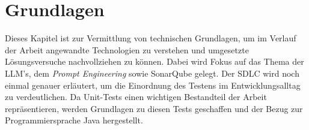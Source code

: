 
\chapter{Grundlagen}
Dieses Kapitel ist zur Vermittlung von technischen Grundlagen, um im Verlauf der Arbeit angewandte Technologien zu verstehen und umgesetzte Lösungsversuche nachvollziehen zu können. Dabei wird Fokus auf das Thema der LLM's, dem \textit{Prompt Engineering} sowie SonarQube gelegt. Der SDLC wird noch einmal genauer erläutert, um die Einordnung des Testens im Entwicklungsalltag zu verdeutlichen. Da Unit-Tests einen wichtigen Bestandteil der Arbeit repräsentieren, werden Grundlagen zu diesen Tests geschaffen und der Bezug zur Programmiersprache Java hergestellt.

